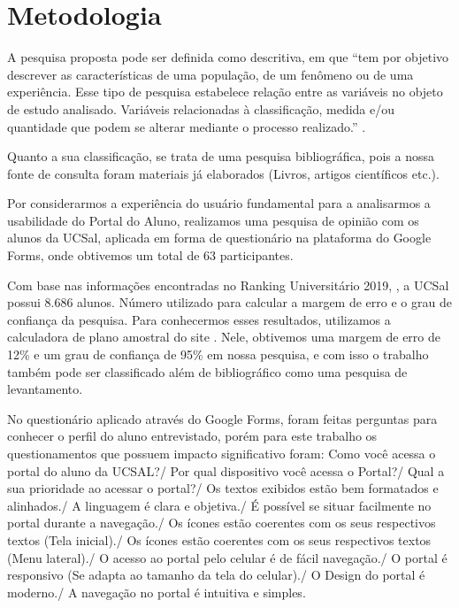 \documentclass[12pt]{article}
\begin{document}
\section{Metodologia\label{sec:metodologia}}
A pesquisa proposta pode ser definida como descritiva, em que “tem por objetivo descrever as características de uma população, de um fenômeno ou de uma experiência. Esse tipo de pesquisa estabelece relação entre as variáveis no objeto de estudo analisado. Variáveis relacionadas à classificação, medida e/ou quantidade que podem se alterar mediante o processo realizado.” \cite{duarte}.

Quanto a sua classificação, se trata de uma pesquisa bibliográfica, pois a nossa fonte de consulta foram materiais já elaborados (Livros, artigos científicos etc.). 

Por considerarmos a experiência do usuário fundamental para a analisarmos a usabilidade do Portal do Aluno, realizamos uma pesquisa de opinião com os alunos da UCSal, aplicada em forma de questionário na plataforma do Google Forms, onde obtivemos um total de 63 participantes. 

Com base nas informações encontradas no Ranking Universitário 2019, , a UCSal possui 8.686 alunos. Número utilizado para calcular a margem de erro e o grau de confiança da pesquisa. Para conhecermos esses resultados, utilizamos a calculadora de plano amostral do site . Nele, obtivemos uma margem de erro de 12\% e um grau de confiança de 95\% em nossa pesquisa, e com isso o trabalho também pode ser classificado além de bibliográfico como uma pesquisa de levantamento. 

No questionário aplicado através do Google Forms, foram feitas perguntas para conhecer o perfil do aluno entrevistado, porém para este trabalho os questionamentos que possuem impacto significativo foram: Como você acessa o portal do aluno da UCSAL?/ Por qual dispositivo você acessa o Portal?/ Qual a sua prioridade ao acessar o portal?/ Os textos exibidos estão bem formatados e alinhados./ A linguagem é clara e objetiva./ É possível se situar facilmente no portal durante a navegação./ Os ícones estão coerentes com os seus respectivos textos (Tela inicial)./ Os ícones estão coerentes com os seus respectivos textos (Menu lateral)./ O acesso ao portal pelo celular é de fácil navegação./ O portal é responsivo (Se adapta ao tamanho da tela do celular)./ O Design do portal é moderno./ A navegação no portal é intuitiva e simples.
\end{document}
